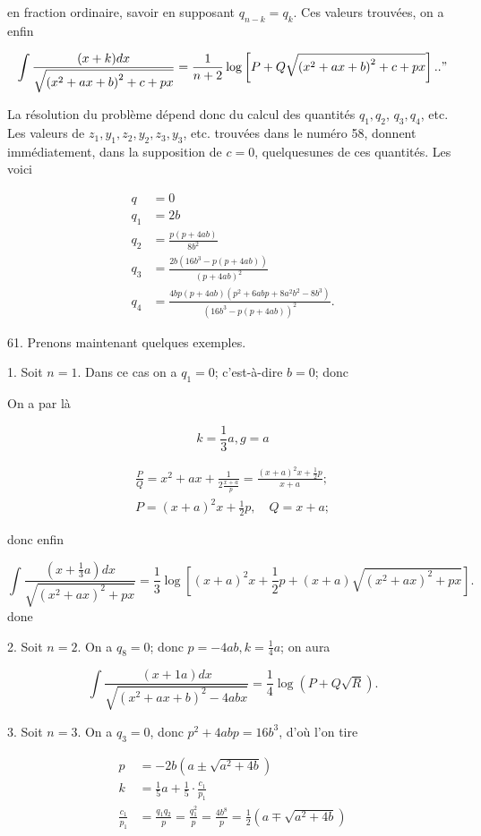\documentclass{article}
\begin{document}
en fraction ordinaire, savoir en supposant \(q_{n-k}=q_{k}\). Ces valeurs trouvées, on a enfin

\[
\int \frac{(x+k) d x}{\sqrt{\left(x^{2}+a x+b\right)^{2}+c+p x}}=\frac{1}{n+2} \log \left[P+Q \sqrt{\left(x^{2}+a x+b\right)^{2}+c+p x}\right] . . "
\]

La résolution du problème dépend donc du calcul des quantités \(q_{1}, q_{2}\), \(q_{3}, q_{4}\), etc. Les valeurs de \(z_{1}, y_{1}, z_{2}, y_{2}, z_{3}, y_{3}\), etc. trouvées dans le numéro 58, donnent immédiatement, dans la supposition de \(c=0\), quelquesunes de ces quantités. Les voici

\[
\begin{aligned}
q & =0 \\
q_{1} & =2 b \\
q_{2} & =\frac{p(p+4 a b)}{8 b^{2}} \\
q_{3} & =\frac{2 b\left(16 b^{3}-p(p+4 a b)\right)}{(p+4 a b)^{2}} \\
q_{4} & =\frac{4 b p(p+4 a b)\left(p^{2}+6 a b p+8 a^{2} b^{2}-8 b^{3}\right)}{\left(16 b^{3}-p(p+4 a b)\right)^{2}} .
\end{aligned}
\]

61. Prenons maintenant quelques exemples.

1. Soit \(n=1\). Dans ce cas on a \(q_{1}=0\); c'est-à-dire \(b=0\); donc

On a par là

\[
k=\frac{1}{3} a, g=a
\]

\[
\begin{gathered}
\frac{P}{Q}=x^{2}+a x+\frac{1}{2 \frac{x+a}{p}}=\frac{(x+a)^{2} x+\frac{1}{2} p}{x+a} ; \\
P=(x+a)^{2} x+\frac{1}{2} p, \quad Q=x+a ;
\end{gathered}
\]

donc enfin

\[
\int \frac{\left(x+\frac{1}{3} a\right) d x}{\sqrt{\left(x^{2}+a x\right)^{2}+p x}}=\frac{1}{3} \log \left[(x+a)^{2} x+\frac{1}{2} p+(x+a) \sqrt{\left(x^{2}+a x\right)^{2}+p x}\right] .
\]
done

2. Soit \(n=2\). On a \(q_{8}=0\); donc \(p=-4 a b, k=\frac{1}{4} a\); on aura

\[
\int \frac{(x+1 a) d x}{\sqrt{\left(x^{2}+a x+b\right)^{2}-4 a b x}}=\frac{1}{4} \log (P+Q \sqrt{R}) .
\]

3. Soit \(n=3\). On a \(q_{3}=0\), donc \(p^{2}+4 a b p=16 b^{3}\), d'où l'on tire

\[
\begin{aligned}
p & =-2 b\left(a \pm \sqrt{a^{2}+4 b}\right) \\
k & =\frac{1}{5} a+\frac{1}{5} \cdot \frac{c_{1}}{p_{1}} \\
\frac{c_{1}}{p_{1}} & =\frac{q_{1} q_{2}}{p}=\frac{q_{1}^{2}}{p}=\frac{4 b^{8}}{p}=\frac{1}{2}\left(a \mp \sqrt{a^{2}+4 b}\right)
\end{aligned}
\]
\end{document}
